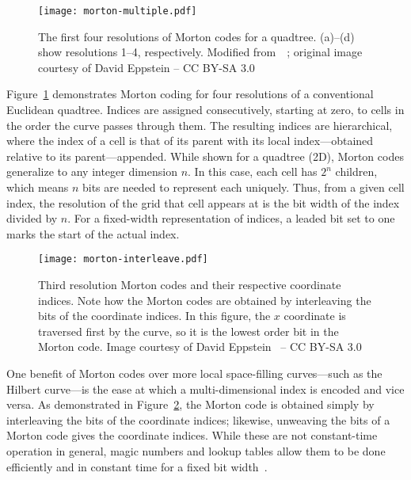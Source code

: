 \begin{figure}[ht!]
	\centering
	\texttt{[image: morton-multiple.pdf]}
	\caption[Four resolutions of Morton codes]{
		The first four resolutions of Morton codes for a quadtree.
		(a)--(d) show resolutions 1--4, respectively.
		Modified from~~\cite{morton-multiple}; original image courtesy of David Eppstein -- CC BY-SA 3.0
	}
	\label{fig:morton-multiple}
\end{figure}


Figure~\ref{fig:morton-multiple} demonstrates Morton coding for four resolutions of a conventional Euclidean quadtree.
Indices are assigned consecutively, starting at zero, to cells in the order the curve passes through them.
The resulting indices are hierarchical, where the index of a cell is that of its parent with its local index---obtained relative to its parent---appended.
While shown for a quadtree (2D), Morton codes generalize to any integer dimension $n$.
In this case, each cell has $2^n$ children, which means $n$ bits are needed to represent each uniquely.
Thus, from a given cell index, the resolution of the grid that cell appears at is the bit width of the index divided by $n$.
For a fixed-width representation of indices, a leaded bit set to one marks the start of the actual index.


\begin{figure}[htp!]
	\centering
	\texttt{[image: morton-interleave.pdf]}
	\caption[Morton codes by bit-interleaving]{
		Third resolution Morton codes and their respective coordinate indices.
		Note how the Morton codes are obtained by interleaving the bits of the coordinate indices.
		In this figure, the $x$ coordinate is traversed first by the curve, so it is the lowest order bit in the Morton code.
		Image courtesy of David Eppstein~\cite{morton-interleave} -- CC BY-SA 3.0
	}
	\label{fig:morton-interleave}
\end{figure}


One benefit of Morton codes over more local space-filling curves---such as the Hilbert curve---is the ease at which a multi-dimensional index is encoded and vice versa.
As demonstrated in Figure~\ref{fig:morton-interleave}, the Morton code is obtained simply by interleaving the bits of the coordinate indices; likewise, unweaving the bits of a Morton code gives the coordinate indices.
While these are not constant-time operation in general, magic numbers and lookup tables allow them to be done efficiently and in constant time for a fixed bit width~\cite{bit twiddle, libmorton}.


